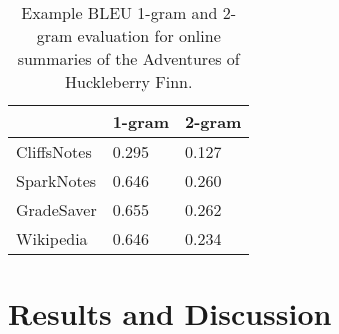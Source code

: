 \begin{table}[hbt]
	\centering
	\caption{Example BLEU 1-gram and 2-gram evaluation for online summaries of the Adventures of Huckleberry Finn.}\label{table:bleu_huckfinn}
	\begin{tabular}{l l l }
		\toprule
		\textbf{}   & \textbf{1-gram} & \textbf{2-gram} \\ \midrule
		CliffsNotes & 0.295           & 0.127           \\ \midrule
		SparkNotes  & 0.646           & 0.260           \\ \midrule
		GradeSaver  & 0.655           & 0.262           \\ \midrule
		Wikipedia   & 0.646           & 0.234           \\
		\bottomrule
	\end{tabular}
\end{table}


\section{Results and Discussion}
